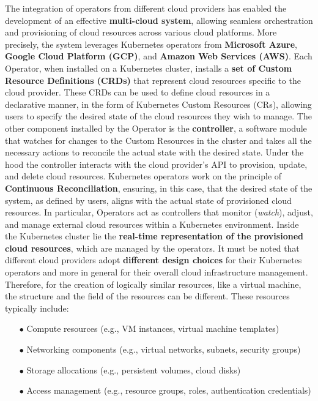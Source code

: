 The integration of operators from different cloud providers has enabled the development of an effective \textbf{multi-cloud system}, allowing seamless orchestration and provisioning of cloud resources across various cloud platforms. 
More precisely, the system leverages Kubernetes operators from \textbf{Microsoft Azure}, \textbf{Google Cloud Platform (GCP)}, and \textbf{Amazon Web Services (AWS)}.
Each Operator, when installed on a Kubernetes cluster, installs a \textbf{set of Custom Resource Definitions (CRDs)} that represent cloud resources specific to the cloud provider.
These CRDs can be used to define cloud resources in a declarative manner, in the form of Kubernetes Custom Resources (CRs), allowing users to specify the desired state of the cloud resources they wish to manage.
The other component installed by the Operator is the \textbf{controller}, a software module that watches for changes to the Custom Resources in the cluster and takes all the necessary actions to reconcile the actual state with the desired state.
Under the hood the controller interacts with the cloud provider's API to provision, update, and delete cloud resources.
Kubernetes operators work on the principle of \textbf{Continuous Reconciliation}, ensuring, in this case, that the desired state of the system, as defined by users, aligns with the actual state of provisioned cloud resources. 
In particular, Operators act as controllers that monitor (\textit{watch}), adjust, and manage external cloud resources within a Kubernetes environment. 
Inside the Kubernetes cluster lie the \textbf{real-time representation of the provisioned cloud resources}, which are managed by the operators.
It must be noted that different cloud providers adopt \textbf{different design choices} for their Kubernetes operators and more in general for their overall cloud infrastructure management. 
Therefore, for the creation of logically similar resources, like a virtual machine, the structure and the field of the resources can be different. 
These resources typically include:
\begin{itemize}[itemsep=0.2pt, topsep=1pt]
  \item[$\bullet$] Compute resources (e.g., VM instances, virtual machine templates)
  \item[$\bullet$] Networking components (e.g., virtual networks, subnets, security groups)
  \item[$\bullet$] Storage allocations (e.g., persistent volumes, cloud disks)
  \item[$\bullet$] Access management (e.g., resource groups, roles, authentication credentials)
\end{itemize}

